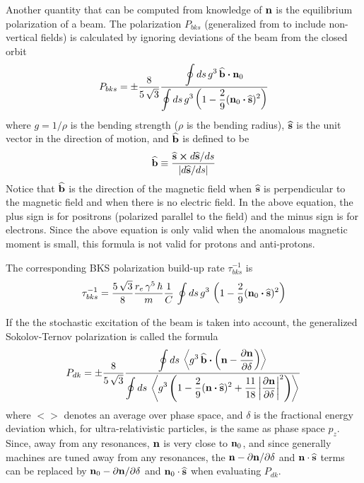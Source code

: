 Another quantity that can be computed from knowledge of ${\bf n}$ is the equilibrium polarization of a
beam. The  polarization $P_{bks}$ (generalized from
 to include non-vertical fields) is calculated by ignoring deviations of the beam
from the closed orbit\cite{b:barber99}
\begin{equation}
  P_{bks} = \pm \frac{8}{5 \, \sqrt{3}}
  \frac{\displaystyle \oint ds \, g^3 \, \widehat{{\bf b}} \mathbin{\boldsymbol{\cdot}} {\bf n}_0}
  {\displaystyle \oint ds \, g^3 \left( 1 - \frac{2}{9} ({\bf n}_0 \mathbin{\boldsymbol{\cdot}} \widehat{{\bf s}})^2 \right)}
\end{equation}
where $g = 1/\rho$ is the bending strength ($\rho$ is the bending radius), $\widehat{{\bf s}}$ is the unit
vector in the direction of motion, and $\widehat{{\bf b}}$ is defined to be
\begin{equation}
  \widehat{{\bf b}} \equiv \frac{\widehat{{\bf s}} \mathbin{\boldsymbol{\times}} d\widehat{{\bf s}}/ds}{|d\widehat{{\bf s}}/ds|}
\end{equation}
Notice that $\widehat{{\bf b}}$ is the direction of the magnetic field when $\widehat{{\bf s}}$ is perpendicular to
the magnetic field and when there is no electric field. In the above equation, the plus sign is for
positrons (polarized parallel to the field) and the minus sign is for electrons. Since the above
equation is only valid when the anomalous magnetic moment is small\cite{b:jackson}, this formula is
not valid for protons and anti-protons.

The corresponding BKS polarization build-up rate $\tau_{bks}^{-1}$ is
\begin{equation}
  \tau_{bks}^{-1} = \frac{5 \, \sqrt{3}}{8} \frac{r_e \, \gamma^5 \, \hbar}{m} \frac{1}{C} \,
    \oint ds \, g^3 \, \left( 1 - \frac{2}{9} ({\bf n}_0 \mathbin{\boldsymbol{\cdot}} \widehat{{\bf s}})^2 \right)
  \label{tbks}
\end{equation}

If the the stochastic excitation of the beam is taken into account, the generalized Sokolov-Ternov
polarization is called the  formula
\begin{equation}
  P_{dk} = \pm \frac{8}{5 \, \sqrt{3}}
  \frac{\displaystyle \oint ds \, \left< g^3 \, \widehat{{\bf b}} \mathbin{\boldsymbol{\cdot}} 
    \left( {\bf n} - \frac{\partial {\bf n}}{\partial \delta} \right) \right>}
  {\displaystyle \oint ds \, \left< g^3 \left( 1 - \frac{2}{9} ({\bf n} \mathbin{\boldsymbol{\cdot}} \widehat{{\bf s}})^2 + 
    \frac{11}{18} \left| \frac{\partial {\bf n}}{\partial \delta} \right|^2 \right) \right>}
\end{equation}
where $<>$ denotes an average over phase space, and $\delta$ is the fractional energy deviation
which, for ultra-relativistic particles, is the same as phase space $p_z$. Since, away from any
resonances, ${\bf n}$ is very close to ${\bf n}_0$, and since generally machines are tuned away from any
resonances, the ${\bf n} - \partial{\bf n}/\partial\delta$ and ${\bf n}\cdot\widehat{{\bf s}}$ terms can be replaced
by ${\bf n}_0 - \partial{\bf n}/\partial\delta$ and ${\bf n}_0\cdot\widehat{{\bf s}}$ when evaluating $P_{dk}$.

